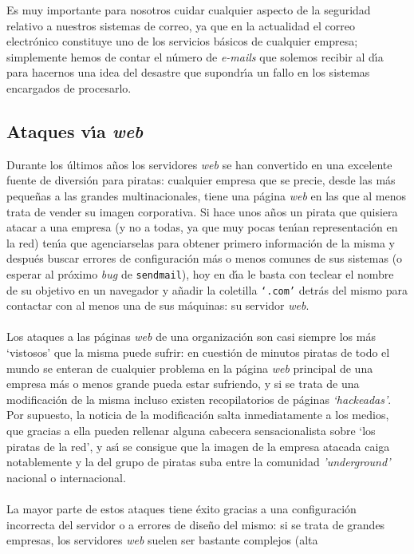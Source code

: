 Es muy importante para nosotros cuidar cualquier aspecto de la seguridad 
relativo a nuestros sistemas de correo, ya que en la actualidad el correo
electr\'onico constituye uno de los servicios b\'asicos de cualquier empresa;
simplemente hemos de contar el n\'umero de {\it e-mails} que solemos recibir al
d\'{\i}a para hacernos una idea del desastre que supondr\'{\i}a un fallo en
los sistemas encargados de procesarlo.
\subsection{Ataques v\'{\i}a {\it web}}
Durante los \'ultimos a\~nos los servidores {\it web} se han convertido en una
excelente fuente de diversi\'on para piratas: cualquier empresa que se precie,
desde las m\'as peque\~nas a las grandes multinacionales, tiene una p\'agina 
{\it web} en las que al menos trata de vender su imagen corporativa. Si hace 
unos a\~nos un pirata que quisiera atacar a una empresa (y no a todas, ya que
muy pocas ten\'{\i}an representaci\'on en la red) ten\'{\i}a que agenciarselas
para obtener primero informaci\'on de la misma y despu\'es buscar errores de
configuraci\'on m\'as o menos comunes de sus sistemas (o esperar al pr\'oximo
{\it bug} de {\tt sendmail}), hoy en d\'{\i}a le basta con teclear el nombre
de su objetivo en un navegador y a\~nadir la coletilla {\tt `.com'} detr\'as 
del mismo para contactar con al menos una de sus m\'aquinas: su servidor {\it
web}.\\
\\Los ataques a las p\'aginas {\it web} de una organizaci\'on son casi siempre
los m\'as `vistosos' que la misma puede sufrir: en cuesti\'on de minutos piratas
de todo el mundo se enteran de cualquier problema en la p\'agina {\it web}
principal de una empresa m\'as o menos grande pueda estar sufriendo, y si se
trata de una modificaci\'on de la misma incluso existen recopilatorios de 
p\'aginas {\it `hackeadas'}. Por supuesto, la noticia de la modificaci\'on 
salta inmediatamente a los medios, que gracias a ella pueden rellenar alguna
cabecera sensacionalista sobre `los piratas de la red', y as\'{\i} se consigue
que la imagen de la empresa atacada caiga notablemente y la del grupo de piratas
suba entre la comunidad {\it 'underground'} nacional o internacional.\\
\\La mayor parte de estos ataques tiene \'exito gracias a una configuraci\'on
incorrecta del servidor o a errores de dise\~no del mismo: si se trata de
grandes empresas, los servidores {\it web} suelen ser bastante complejos (alta

